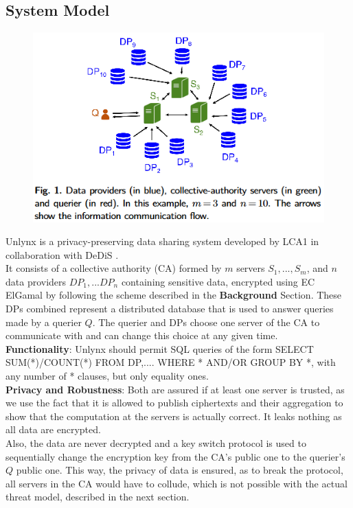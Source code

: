 \documentclass{article}
\begin{document}
\subsection{System Model}
\begin{figure}[H]
\centering
\includegraphics[scale=0.8]{img/UnlynxFunc.png}
\end{figure}
Unlynx is a privacy-preserving data sharing system developed by LCA1 \cite{lca} in collaboration with DeDiS \cite{dedis}.\\
It consists of a collective authority (CA) formed by $m$ servers $S_1,...,S_m$, and $n$ data providers $DP_1,...DP_n$ containing sensitive data, encrypted using EC ElGamal by following the scheme described in the \textbf{Background} Section. These DPs combined represent a distributed database that is used to answer queries made by a querier $Q$. The querier and DPs choose one server of the CA to communicate with and can change this choice at any given time.\\
\textbf{Functionality}: Unlynx should permit SQL queries of the form SELECT SUM(*)/COUNT(*) FROM DP,.... WHERE * AND/OR GROUP BY *, with any number of * clauses, but only equality ones.\\
\textbf{Privacy and Robustness}: Both are assured if at least one server is trusted, as we use the fact that it is allowed to publish ciphertexts and their aggregation to show that the computation at the servers is actually correct. It leaks nothing as all data are encrypted.\\
Also, the data are never decrypted and a key switch protocol is used to sequentially change the encryption key from the CA's public one to the querier's $Q$ public one. This way, the privacy of data is ensured, as to break the protocol, all servers in the CA would have to collude, which is not possible with the actual threat model, described in the next section.
\end{document}
